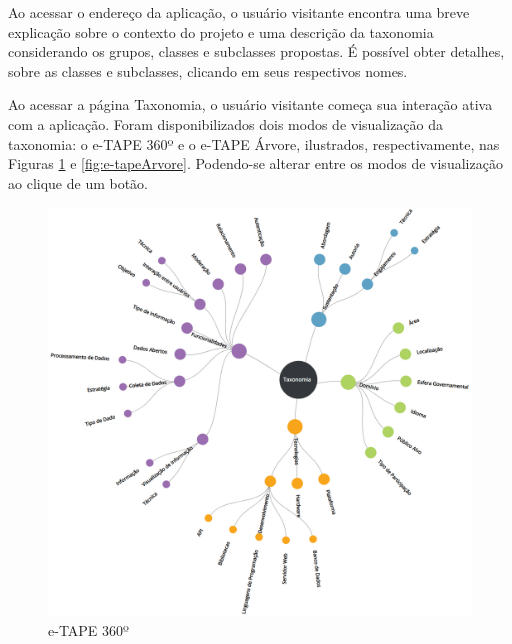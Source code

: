 \par
Ao acessar o endereço da aplicação, o usuário visitante encontra uma breve explicação sobre o contexto do projeto e uma descrição da taxonomia considerando os grupos,
classes e subclasses propostas. É possível obter detalhes, sobre as classes e subclasses, clicando em seus respectivos nomes. 

\par
Ao acessar a página Taxonomia, o usuário visitante começa sua interação ativa com a aplicação.
Foram disponibilizados dois modos de visualização da taxonomia: o e-TAPE 360º e o e-TAPE Árvore, ilustrados, respectivamente,
nas Figuras \ref{fig:e-tape360} e \ref{fig:e-tapeArvore}. Podendo-se alterar entre os modos de visualização ao clique de um botão.

\begin{figure}[!ht]
    \centering
    \includegraphics[scale=0.20]{./figuras/taxonomia-cropped.png}
    \caption{e-TAPE 360º}
    \label{fig:e-tape360}
\end{figure}

